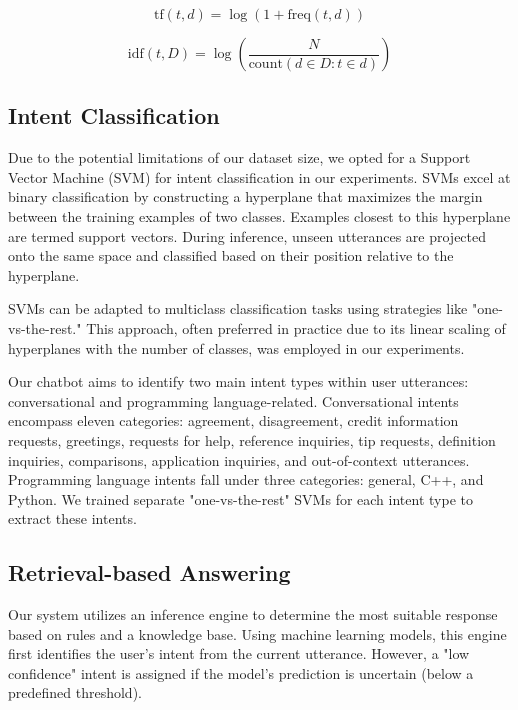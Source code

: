 \documentclass[conference]{IEEEtran}
\begin{document}
    \begin{equation}
    \text{tf}(t, d) = \log(1 + \text{freq}(t, d))
    \end{equation}
    
    \begin{equation}
    \text{idf}(t, D) = \log \left( \frac{N}{\text{count}(d \in D : t \in d)} \right)
    \end{equation}

    \subsection{Intent Classification}
    Due to the potential limitations of our dataset size, we opted for a Support Vector Machine (SVM) for intent classification in our experiments. SVMs excel at binary classification by constructing a hyperplane that maximizes the margin between the training examples of two classes. Examples closest to this hyperplane are termed support vectors. During inference, unseen utterances are projected onto the same space and classified based on their position relative to the hyperplane.
    
    SVMs can be adapted to multiclass classification tasks using strategies like "one-vs-the-rest." This approach, often preferred in practice due to its linear scaling of hyperplanes with the number of classes, was employed in our experiments.
    
    Our chatbot aims to identify two main intent types within user utterances: conversational and programming language-related. Conversational intents encompass eleven categories: agreement, disagreement, credit information requests, greetings, requests for help, reference inquiries, tip requests, definition inquiries, comparisons, application inquiries, and out-of-context utterances. Programming language intents fall under three categories: general, C++, and Python. We trained separate "one-vs-the-rest" SVMs for each intent type to extract these intents.

    \subsection{Retrieval-based Answering}
    Our system utilizes an inference engine to determine the most suitable response based on rules and a knowledge base. Using machine learning models, this engine first identifies the user's intent from the current utterance. However, a "low confidence" intent is assigned if the model's prediction is uncertain (below a predefined threshold).
    
\end{document}

